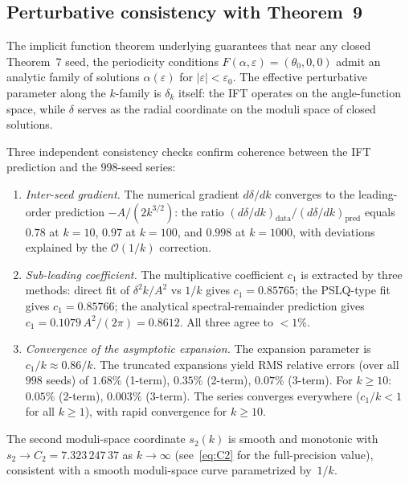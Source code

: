 \documentclass[11pt,a4paper]{article}
\theoremstyle{plain}
\theoremstyle{definition}
\theoremstyle{remark}
\newcommand{\Oo}{\mathcal{O}}
\begin{document}
\subsection{Perturbative consistency with Theorem~9}%
\label{sec:theorem9-consistency}

The implicit function theorem underlying
{\cite[Theorem~9]{BHS-comp}} guarantees that near any closed
Theorem~7 seed, the periodicity conditions
$F(\alpha,\varepsilon)=(\theta_0,0,0)$ admit an analytic family of
solutions $\alpha(\varepsilon)$ for $|\varepsilon|<\varepsilon_0$.
The effective perturbative parameter along the $k$-family is
$\delta_k$ itself: the IFT operates on the angle-function space,
while $\delta$ serves as the radial coordinate on the moduli
space of closed solutions.

Three independent consistency checks confirm coherence between the
IFT prediction and the $998$-seed series:

\begin{enumerate}[nosep,label=(\roman*)]
\item \emph{Inter-seed gradient.}
  The numerical gradient $d\delta/dk$ converges to the leading-order
  prediction $-A/(2k^{3/2})$: the ratio
  $(d\delta/dk)_{\mathrm{data}} / (d\delta/dk)_{\mathrm{pred}}$
  equals $0.78$ at $k=10$, $0.97$ at $k=100$, and $0.998$ at
  $k=1000$, with deviations explained by the $\Oo(1/k)$ correction.

\item \emph{Sub-leading coefficient.}
  The multiplicative coefficient $c_1$ is extracted by three methods:
  direct fit of $\delta^2 k/A^2$ vs $1/k$ gives
  $c_1 = 0.85765$;
  the PSLQ-type fit gives $c_1 = 0.85766$;
  the analytical spectral-remainder prediction gives
  $c_1 = 0.1079\,A^2/(2\pi) = 0.8612$.
  All three agree to $<1\%$.

\item \emph{Convergence of the asymptotic expansion.}
  The expansion parameter is $c_1/k \approx 0.86/k$.
  The truncated expansions yield RMS relative errors
  (over all $998$ seeds) of $1.68\%$ (1-term),
  $0.35\%$ (2-term), $0.07\%$ (3-term).
  For $k \geq 10$: $0.05\%$ (2-term), $0.003\%$ (3-term).
  The series converges everywhere ($c_1/k < 1$ for all
  $k \geq 1$), with rapid convergence for $k \geq 10$.
\end{enumerate}

\noindent
The second moduli-space coordinate $s_2(k)$ is smooth and monotonic
with $s_2 \to C_2 = 7.323\,247\,37$ as $k\to\infty$
(see~\eqref{eq:C2} for the full-precision value),
consistent with a smooth
moduli-space curve parametrized by~$1/k$.
\end{document}
